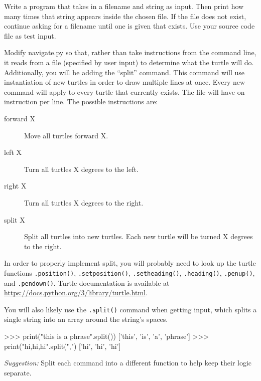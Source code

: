 \documentclass[11pt]{cselabheader}
\begin{document}
\begin{ex} Write a program that
  takes in a filename and string as input. Then print how many times that string
  appears inside the chosen file. If the file does not exist, continue asking
  for a filename until one is given that exists. Use your source code file as
  test input.
\end{ex}

\begin{ex}[navigate3.py] Modify navigate.py so that, rather than take instructions
    from the command line, it reads from a file (specified by user input) to
    determine what the turtle will do. Additionally, you will be adding the
    ``split'' command. This command will use instantiation of new turtles in order
    to draw multiple lines at once. Every new command will apply to every turtle
    that currently exists. The file will have on instruction per line. The
    possible instructions are:

    \begin{description}
      \item[forward X] Move all turtles forward X.
      \item[left X] Turn all turtles X degrees to the left.
      \item[right X] Turn all turtles X degrees to the right.
      \item[split X] Split all turtles into new turtles. Each new turtle will be turned X degrees to the right.
    \end{description}

    In order to properly implement split, you will probably need to look up the
    turtle functions \lstinline{.position()}, \lstinline{.setposition()},
    \lstinline{.setheading()}, \lstinline{.heading()}, \lstinline{.penup()}, and
    \lstinline{.pendown()}. Turtle documentation is available at
    \url{https://docs.python.org/3/library/turtle.html}.

    You will also likely use the \lstinline{.split()} command when getting input, which splits a single string into an array around the string's spaces.
    \begin{pyconcode}
>>> print("this is a phrase".split())
['this', 'is', 'a', 'phrase']
>>> print("hi,hi,hi".split(",")
['hi', 'hi', 'hi']
    \end{pyconcode}

    \emph{Suggestion:} Split each command into a different function to help keep their logic separate.


\end{ex}
\end{document}
